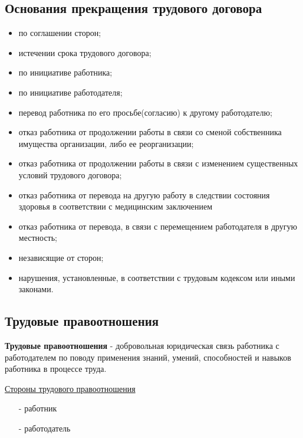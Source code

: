 \documentclass[a5paper,10pt]{article}
\begin{document}
		\subsection{Основания прекращения трудового договора}
			\begin{itemize}[itemsep=0pt]
				\item по соглашении сторон;
				\item истечении срока трудового договора;
				\item по инициативе работника;
				\item по инициативе работодателя;
				\item перевод работника по его просьбе(согласию) к другому работодателю;
				\item отказ работника от продолжении работы в связи со сменой собственника имущества организации, либо ее реорганизации;
				\item отказ работника от продолжении работы в связи с изменением существенных условий трудового договора;
				\item отказ работника от перевода на другую работу в следствии состояния здоровья в соответствии с медицинским заключением
				\item отказ работника от перевода, в связи с перемещением работодателя в другую местность;
				\item независящие от сторон;
				\item нарушения, установленные, в соответствии с трудовым кодексом или иными законами.
			\end{itemize}

		\subsection{Трудовые правоотношения}
			\textbf{Трудовые правоотношения} - добровольная юридическая связь работника с работодателем по поводу применения знаний, умений, способностей и навыков работника в процессе труда.

			\underline{Стороны трудового правоотношения}
			\begin{itemize}[itemsep=0pt]
				\item[-] работник
				\item[-] работодатель
			\end{itemize}
\end{document}
